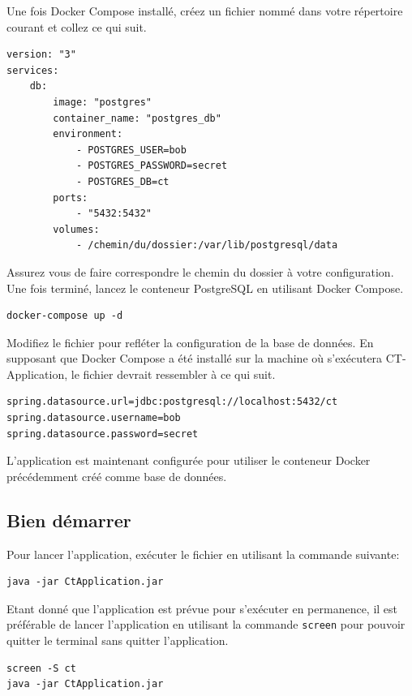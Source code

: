 \documentclass{article}
\begin{document}
Une fois Docker Compose installé, créez un fichier nommé  dans votre répertoire courant et collez ce qui suit.

\begin{verbatim}
version: "3"
services:
    db:
        image: "postgres"
        container_name: "postgres_db"
        environment:
            - POSTGRES_USER=bob
            - POSTGRES_PASSWORD=secret
            - POSTGRES_DB=ct
        ports:
            - "5432:5432"
        volumes:
            - /chemin/du/dossier:/var/lib/postgresql/data
\end{verbatim}

Assurez vous de faire correspondre le chemin du dossier à votre configuration.  Une fois terminé, lancez le conteneur PostgreSQL en utilisant Docker Compose.

\begin{verbatim}
docker-compose up -d
\end{verbatim}

Modifiez le fichier  pour refléter la configuration de la base de données.  En supposant que Docker Compose a été installé sur la machine où s'exécutera CT-Application, le fichier devrait ressembler à ce qui suit.

\begin{verbatim}
spring.datasource.url=jdbc:postgresql://localhost:5432/ct
spring.datasource.username=bob
spring.datasource.password=secret
\end{verbatim}

L'application est maintenant configurée pour utiliser le conteneur Docker précédemment créé comme base de données.


\subsection{Bien démarrer}

Pour lancer l'application, exécuter le fichier  en utilisant la commande suivante: 

\begin{verbatim}
java -jar CtApplication.jar
\end{verbatim}

Etant donné que l'application est prévue pour s'exécuter en permanence, il est préférable de lancer l'application en utilisant la commande \texttt{screen} pour pouvoir quitter le terminal sans quitter l'application.

\begin{verbatim}
screen -S ct
java -jar CtApplication.jar
\end{verbatim}
\end{document}
